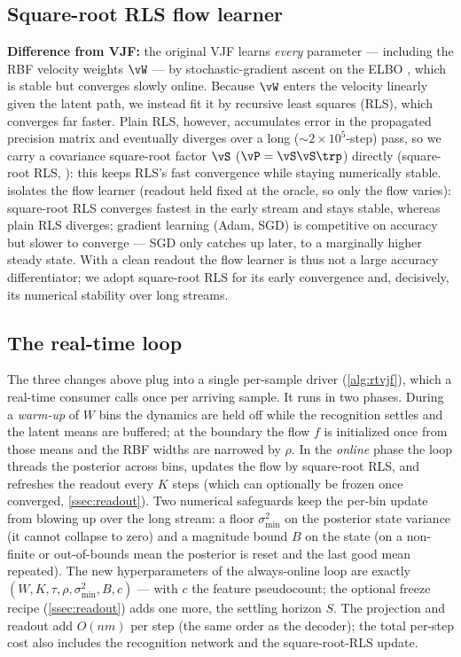\documentclass[11pt]{article}
\begin{document}
\subsection{Square-root RLS flow learner}\label{ssec:srrls}
\textbf{Difference from VJF:} the original VJF learns \emph{every} parameter --- including the RBF
velocity weights $\vW$ --- by stochastic-gradient ascent on the ELBO \autocite{zhao2020variational},
which is stable but converges slowly online. Because $\vW$ enters the velocity linearly given the
latent path, we instead fit it by recursive least squares (RLS), which converges far faster. Plain
RLS, however, accumulates error in the propagated precision matrix and eventually diverges over a
long ($\sim2\times10^5$-step) pass, so we carry a covariance square-root factor $\vS$
($\vP=\vS\vS\trp$) directly (square-root RLS, \autocite{haykin2014adaptive,schoenberg1983implementation}):
this keeps RLS's fast convergence while staying numerically stable.  isolates the
flow learner (readout held fixed at the oracle, so only the flow varies): square-root
RLS converges fastest in the early stream and stays stable, whereas plain RLS diverges; gradient
learning (Adam, SGD) is competitive on accuracy but slower to converge --- SGD only catches up
later, to a marginally higher steady state. With a clean readout the flow learner is thus not a
large accuracy differentiator; we adopt square-root RLS for its early convergence and, decisively,
its numerical stability over long streams.

\subsection{The real-time loop}\label{ssec:loop}
The three changes above plug into a single per-sample driver (\cref{alg:rtvjf}), which a real-time
consumer calls once per arriving sample. It runs in two phases. During a \emph{warm-up} of $W$ bins
the dynamics are held off while the recognition settles and the latent means are buffered; at the
boundary the flow $f$ is initialized once from those means and the RBF widths are narrowed by
$\rho$. In the \emph{online} phase the loop threads the posterior across bins, updates the flow by
square-root RLS, and refreshes the readout every $K$ steps (which can optionally be frozen once
converged, \cref{ssec:readout}). Two numerical safeguards keep the per-bin update from blowing up
over the long stream: a floor $\sigma^2_{\min}$ on the posterior state variance (it cannot collapse
to zero) and a magnitude bound $B$ on the state (on a non-finite or out-of-bounds mean the
posterior is reset and the last good mean repeated). The new hyperparameters of the always-online
loop are exactly $(W,K,\tau,\rho,\sigma^2_{\min},B,c)$ --- with $c$ the feature pseudocount; the
optional freeze recipe (\cref{ssec:readout}) adds one more, the settling horizon $S$. The projection
and readout add $O(nm)$ per step (the same order as the decoder); the total per-step cost also
includes the recognition network and the square-root-RLS update.
\end{document}
